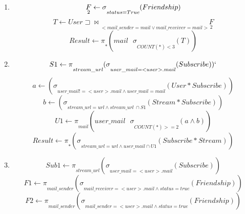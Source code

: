 \documentclass[a4paper,10pt]{article}
\begin{document}
	\begin{enumerate}
	    \item
		\begin{equation}
		\underset{2}{F} \leftarrow \sigma \underset{status = True}{} (Friendship) \\
		\end{equation}
		\begin{equation}
		T \leftarrow User \sqsupset \Join \underset{<mail\_sender = mail \vee mail\_receiver = mail>}{} \underset{2}{F} 
		\end{equation}
		\begin{equation}
		Result \leftarrow \pi \underset{*}{}(mail \  \  \  \sigma \underset{COUNT(*) < 3}{}(T))
		\end{equation}
	    \item
		\begin{equation}
		S1 \leftarrow \pi \underset{stream\_url}{} (\sigma \underset{user\_mail = <user>.mail}{}(Subscribe))`
		\end{equation}
		\begin{equation}
		a \leftarrow (\sigma \underset{user\_mail != <user>.mail \wedge user\_mail = mail}{}(User * Subscribe))
		\end{equation}
		\begin{equation}
		b \leftarrow (\sigma \underset{stream\_url = url \wedge stream\_url\  \cap S1}{}(Stream * Subscribe))
		\end{equation}
		\begin{equation}
		U1 \leftarrow \pi \underset{mail}{} (user\_mail \  \  \  \sigma \underset{COUNT(*) >= 2}{}(a \wedge b))
		\end{equation}
		\begin{equation}
		Result \leftarrow \pi \underset{*}{} (\sigma \underset {stream\_url = url \wedge user\_mail \cap U1}{}(Subscribe * Stream))
		\end{equation}
	    \item 
	          \begin{equation}
		Sub1 \leftarrow \pi \underset{stream\_url}{} (\sigma \underset{user\_mail = <user>.mail}{}(Subscribe))
		\end{equation}
		\begin{equation}
		F1 \leftarrow \pi \underset{mail\_sender}{} (\sigma \underset{mail\_receiver = <user>.mail \wedge status = true}{}(Friendship))
		\end{equation}
		\begin{equation}
		F2 \leftarrow \pi \underset{mail\_sender}{} (\sigma \underset{mail\_sender = <user>.mail \wedge status = true}{}(Friendship))

\end{equation}
\end{enumerate}
\end{document}
